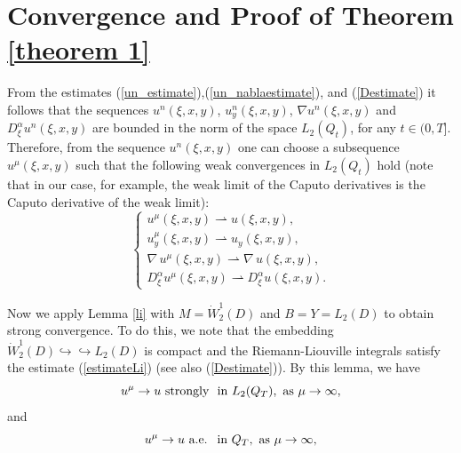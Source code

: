 \documentclass[12pt]{amsart}
\theoremstyle{definition}
\numberwithin{equation}{section}
\begin{document}
\section{Convergence and Proof of Theorem \ref{theorem 1}}

From the estimates (\ref{un_estimate}),(\ref{un_nablaestimate}), and (\ref{Destimate})  it follows that the sequences $u^n(\xi, x, y)$, $u_y^n(\xi, x, y)$, $\nabla u^n(\xi, x, y)$ and $D^\alpha_\xi u^n(\xi, x, y)$ are bounded in the norm of the space $L_2(Q_t)$, for any $t\in (0, T]$. Therefore, from the sequence $u^n(\xi, x, y)$ one can choose a subsequence $u^\mu(\xi, x, y)$ such that the following weak convergences in $L_2(Q_t)$ hold (note that in our case, for example, the weak limit of the Caputo derivatives is the Caputo derivative of the weak limit):
\begin{equation}\label{converUx}
\begin{cases}
u^\mu (\xi, x, y)\rightharpoonup  u (\xi, x, y),\\
u_y^\mu (\xi, x, y)\rightharpoonup  u_y (\xi, x, y),\\
\nabla\,u^\mu (\xi, x, y)\rightharpoonup  \nabla\, u (\xi, x, y), \\
D_\xi^\alpha u^\mu (\xi, x, y) \rightharpoonup D_\xi^\alpha u (\xi, x, y).
\end{cases}
\end{equation}

 Now we apply Lemma \ref{li} with $M= \dot{W}_2^1 (D)$ and $B=Y= L_2(D)$ to obtain strong convergence. To do this, we note that the embedding $\dot{W}_2^1 (D) \hookrightarrow \hookrightarrow  L_2(D)$  is compact and the Riemann-Liouville integrals satisfy the estimate (\ref{estimateLi}) (see also (\ref{Destimate})). By this lemma, we have
 \begin{equation}\label{strong}
u^\mu \to u \,\,\text{strongly\,\, in}  \,\, L_2(Q_T), \,\, \text{as}\,\, \mu \to \infty,   
 \end{equation}
 and
 \begin{equation}\label{almost}
u^\mu \to u \,\,\text{a.e.\,\, in}  \,\, Q_T, \,\, \text{as}\,\, \mu \to \infty,   
 \end{equation}
\end{document}
